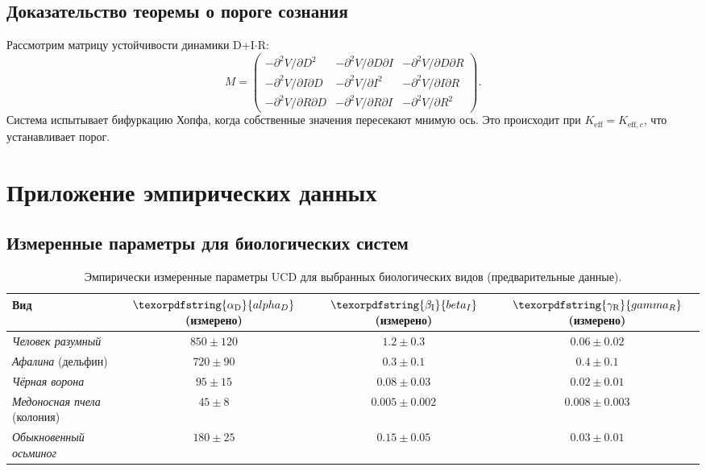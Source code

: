 \documentclass[12pt,a4paper]{article}
\DeclareRobustCommand{\alD}{\texorpdfstring{\ensuremath{\alpha_{\mathrm{D}}}}{alpha_D}}
\DeclareRobustCommand{\beI}{\texorpdfstring{\ensuremath{\beta_{\mathrm{I}}}}{beta_I}}
\DeclareRobustCommand{\gaR}{\texorpdfstring{\ensuremath{\gamma_{\mathrm{R}}}}{gamma_R}}
\newcommand{\eff}{\mathrm{eff}}
\newcommand{\Ke}{K_{\eff}}
\newcommand{\Kec}{K_{\eff,c}}
\begin{document}
	\subsection{Доказательство теоремы о пороге сознания}
	
	Рассмотрим матрицу устойчивости динамики D+I\(\cdot\)R:
	\[
	M = \begin{pmatrix}
		-\partial^2 V/\partial D^2 & -\partial^2 V/\partial D\partial I & -\partial^2 V/\partial D\partial R \\
		-\partial^2 V/\partial I\partial D & -\partial^2 V/\partial I^2 & -\partial^2 V/\partial I\partial R \\
		-\partial^2 V/\partial R\partial D & -\partial^2 V/\partial R\partial I & -\partial^2 V/\partial R^2
	\end{pmatrix}.
	\]
	Система испытывает бифуркацию Хопфа, когда собственные значения пересекают мнимую ось. Это происходит при \(\Ke = \Kec\), что устанавливает порог.
	
	\section{Приложение эмпирических данных}
	
	\subsection{Измеренные параметры для биологических систем}
	
	\begin{table}[ht]
		\centering
		\begin{tabular}{lccc}
			\toprule
			\textbf{Вид} & \(\alD\) (измерено) & \(\beI\) (измерено) & \(\gaR\) (измерено) \\
			\midrule
			\textit{Человек разумный} & \(850 \pm 120\) & \(1.2 \pm 0.3\) & \(0.06 \pm 0.02\) \\
			\textit{Афалина} (дельфин) & \(720 \pm 90\) & \(0.3 \pm 0.1\) & \(0.4 \pm 0.1\) \\
			\textit{Чёрная ворона} & \(95 \pm 15\) & \(0.08 \pm 0.03\) & \(0.02 \pm 0.01\) \\
			\textit{Медоносная пчела} (колония) & \(45 \pm 8\) & \(0.005 \pm 0.002\) & \(0.008 \pm 0.003\) \\
			\textit{Обыкновенный осьминог} & \(180 \pm 25\) & \(0.15 \pm 0.05\) & \(0.03 \pm 0.01\) \\
			\bottomrule
		\end{tabular}
		\caption{Эмпирически измеренные параметры UCD для выбранных биологических видов (предварительные данные).}
		\label{tab:bio-measurements}
	\end{table}
	
\end{document}
